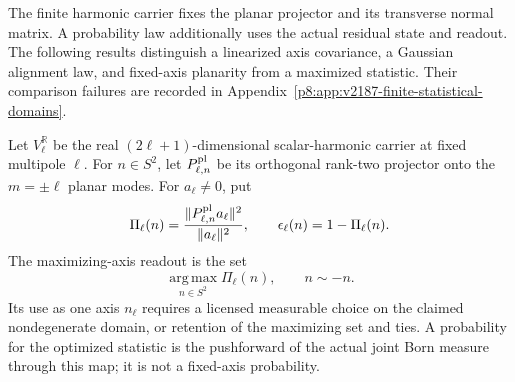 \documentclass[12pt,a4paper]{article}
\begin{document}
The finite harmonic carrier fixes the planar projector and its transverse
normal matrix.  A probability law additionally uses the actual residual
state and readout.  The following results distinguish a linearized axis
covariance, a Gaussian alignment law, and fixed-axis planarity from a
maximized statistic.  Their comparison failures are recorded in
Appendix~\ref{p8:app:v2187-finite-statistical-domains}.

\begin{definition}
\label{p8:def:finite-planar-axis-readout}
Let $V_\ell^{\mathbb R}$ be the real $(2\ell+1)$-dimensional scalar-harmonic
carrier at fixed multipole $\ell$.  For $n\in S^2$, let
$P_{\ell,n}^{\rm pl}$ be its orthogonal rank-two projector onto the
$m=\pm\ell$ planar modes.  For $a_\ell\ne0$, put
\[
 \Pi_\ell(n)=\frac{\|P_{\ell,n}^{\rm pl}a_\ell\|^2}{\|a_\ell\|^2},
 \qquad \epsilon_\ell(n)=1-\Pi_\ell(n).
\]
The maximizing-axis readout is the set
\[
 \operatorname*{arg\,max}_{n\in S^2}\Pi_\ell(n),
 \qquad n\sim -n.
\]
Its use as one axis $n_\ell$ requires a licensed measurable choice on the
claimed nondegenerate domain, or retention of the maximizing set and ties.
A probability for the optimized statistic is the pushforward of the actual
joint Born measure through this map; it is not a fixed-axis probability.
\end{definition}
\end{document}
